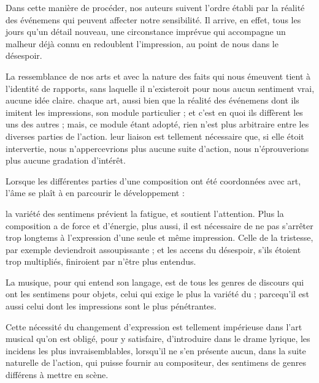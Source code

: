 \documentclass[11pt,a4paper]{article}
\begin{document}

Dans cette  manière de procéder, nos auteurs suivent
l'ordre établi par la réalité des événemens qui peuvent affecter notre
sensibilité. Il arrive, en effet,  tous les jours qu'un détail
nouveau, une circonstance imprévue qui accompagne un malheur déjà connu en
redoublent l'impression, au point de nous  dans le désespoir.

La ressemblance de nos arts  et avec la nature des faits qui
nous émeuvent tient à l'identité de rapports, sans laquelle il n'existeroit
pour nous aucun sentiment vrai, aucune idée claire. chaque art, aussi bien que
la réalité des événemens dont ils imitent les impressions, 
son module particulier ; et c'est en quoi ils diffèrent les uns des autres ;
mais, ce module étant adopté, rien n'est plus arbitraire entre les diverses
parties de l'action. leur liaison est tellement nécessaire que, si elle étoit
intervertie, nous n'appercevrions plus aucune suite d'action, nous
n'éprouverions plus aucune gradation d'intérêt.

Lorsque les différentes parties d'une composition ont été coordonnées avec
art, l'âme se plaît à en parcourir le développement :


la variété des sentimens prévient la fatigue, et 
soutient l'attention. Plus la composition a de force et d'énergie, plus aussi,
il  est nécessaire de ne pas s'arrêter trop longtems
 à l'expression d'une seule et même impression.
Celle de la tristesse, par exemple deviendroit assoupissante ; et les accens du
désespoir, s'ils étoient trop multipliés, finiroient par n'être plus entendus.

La musique, pour qui entend son langage, est de tous les genres de discours qui
ont les sentimens pour objets, celui qui exige le plus 
la variété du  ; parcequ'il est aussi celui dont les
impressions sont le plus pénétrantes.

Cette nécessité du changement d'expression est tellement impérieuse dans l'art
musical qu'on est obligé, pour y satisfaire, d'introduire dans le drame lyrique,
les incidens les plus invraisemblables, lorsqu'il ne s'en présente aucun, dans
la suite naturelle de l'action, qui puisse fournir au compositeur,
 des sentimens de genres différens à mettre en
scène.
\end{document}
